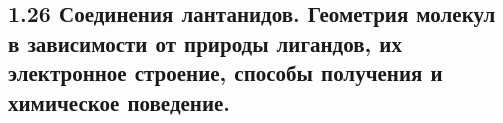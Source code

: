 
\subsection{1.26 Соединения лантанидов. Геометрия молекул в зависимости от природы лигандов, их электронное строение, способы получения и химическое поведение.}


